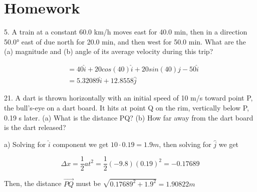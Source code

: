 \documentclass{scrreprt} %
\begin{document}
\section{Homework}

5. A train at a constant 60.0 km/h moves east for 40.0 min,
then  in  a  direction  50.0° east  of  due  north  for  20.0 min, and  then
west for 50.0 min. What are the (a) magnitude and (b) angle of its
average velocity during this trip?

\begin{align*}
	&= 40\hat{i} + 20cos(40)\hat{i} + 20sin(40)\hat{j} - 50 \hat{i} \\
	&= 5.32089\hat{i} + 12.8558\hat{j}
\end{align*}

21. A dart is thrown horizontally with an initial speed of 
10 m/s  toward  point  P, the  bull’s-eye  on  a  dart  board. It  hits  at
point Q on the rim, vertically below P, 0.19 s later. (a) What is the
distance PQ?  (b)  How  far  away  from  the  dart  board  is  the  dart
released?

a) Solving for $\hat{i}$ component we get $10\cdot 0.19 = 1.9 m$, then solving
for $\hat{j}$ we get

$$\Delta x = \frac{1}{2}at^2 = \frac{1}{2}(-9.8)(0.19)^2=-0.17689$$

Then, the distance $\vec{PQ}$ must be $\sqrt{0.17689^2 + 1.9^2} = 1.90822 m$
\end{document}
